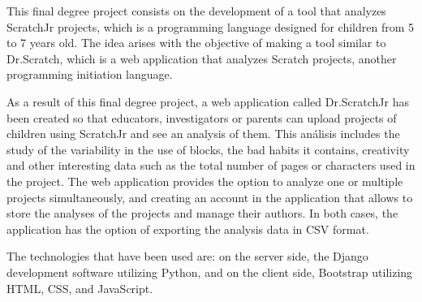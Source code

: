 \documentclass[a4paper, 12pt]{book}
\begin{document}
This final degree project consists on the development of a tool that analyzes ScratchJr projects, which is a programming language designed for children from 5 to 7 years old.
The idea arises with the objective of making a tool similar to Dr.Scratch, which is a web application that analyzes Scratch projects, another programming initiation language.

\vspace{5mm}

As a result of this final degree project, a web application called Dr.ScratchJr has been created so that educators, investigators or parents can upload projects of children using ScratchJr and see an analysis of them.
This análisis includes the study of the variability in the use of blocks, the bad habits it contains, creativity and other interesting data such as the total number of pages or characters used in the project.
The web application provides the option to analyze one or multiple projects simultaneously, and creating an account in the application that allows to store the analyses of the projects and manage their authors. In both cases, the application has the option of exporting the analysis data in CSV format.

\vspace{5mm}

The technologies that have been used are: on the server side, the Django development software utilizing Python, and on the client side, Bootstrap utilizing HTML, CSS, and JavaScript.




\tableofcontents 
\cleardoublepage
\listoffigures %


\end{document}
